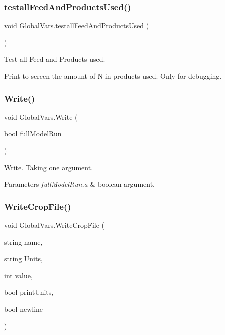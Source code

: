 \subsubsection{\texorpdfstring{testallFeedAndProductsUsed()}{testallFeedAndProductsUsed()}}
{\footnotesize\ttfamily void Global\+Vars.\+testall\+Feed\+And\+Products\+Used (\begin{DoxyParamCaption}{ }\end{DoxyParamCaption})\hspace{0.3cm}{\ttfamily [inline]}}



Test all Feed and Products used. 

Print to screen the amount of N in products used. Only for debugging. \mbox{\label{class_global_vars_af8ac71ca66dd50559a3ff31d6ef11e9a}} 
\subsubsection{\texorpdfstring{Write()}{Write()}}
{\footnotesize\ttfamily void Global\+Vars.\+Write (\begin{DoxyParamCaption}\item[{bool}]{full\+Model\+Run }\end{DoxyParamCaption})\hspace{0.3cm}{\ttfamily [inline]}}



Write. Taking one argument. 


\begin{DoxyParams}{Parameters}
{\em full\+Model\+Run,a} & boolean argument. \\
\hline
\end{DoxyParams}
\mbox{\label{class_global_vars_a9b1bf66183c02889a23501ab5d3a0de4}} 
\subsubsection{\texorpdfstring{WriteCropFile()}{WriteCropFile()}\hspace{0.1cm}{\footnotesize\ttfamily [1/3]}}
{\footnotesize\ttfamily void Global\+Vars.\+Write\+Crop\+File (\begin{DoxyParamCaption}\item[{string}]{name,  }\item[{string}]{Units,  }\item[{int}]{value,  }\item[{bool}]{print\+Units,  }\item[{bool}]{newline }\end{DoxyParamCaption})\hspace{0.3cm}{\ttfamily [inline]}}



